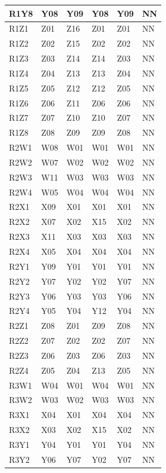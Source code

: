 \documentclass[conference]{IEEEtran}
\begin{document}
{\begin{table}[H]
\begin{tabular}{|l|l|l|l|l|l|}
R1Y8 & Y08 & Y09 & Y08 & Y09 &  NN  \\ \hline
R1Z1 & Z01 & Z16 & Z01 & Z01 &  NN  \\ \hline
R1Z2 & Z02 & Z15 & Z02 & Z02 &  NN  \\ \hline
R1Z3 & Z03 & Z14 & Z14 & Z03 &  NN  \\ \hline
R1Z4 & Z04 & Z13 & Z13 & Z04 &  NN  \\ \hline
R1Z5 & Z05 & Z12 & Z12 & Z05 &  NN  \\ \hline
R1Z6 & Z06 & Z11 & Z06 & Z06 &  NN  \\ \hline
R1Z7 & Z07 & Z10 & Z10 & Z07 &  NN  \\ \hline
R1Z8 & Z08 & Z09 & Z09 & Z08 &  NN  \\ \hline
R2W1 & W08 & W01 & W01 & W01 &  NN  \\ \hline
R2W2 & W07 & W02 & W02 & W02 &  NN  \\ \hline
R2W3 & W11 & W03 & W03 & W03 &  NN  \\ \hline
R2W4 & W05 & W04 & W04 & W04 &  NN  \\ \hline
R2X1 & X09 & X01 & X01 & X01 &  NN  \\ \hline
R2X2 & X07 & X02 & X15 & X02 &  NN  \\ \hline
R2X3 & X11 & X03 & X03 & X03 &  NN  \\ \hline
R2X4 & X05 & X04 & X04 & X04 &  NN  \\ \hline
R2Y1 & Y09 & Y01 & Y01 & Y01 &  NN  \\ \hline
R2Y2 & Y07 & Y02 & Y02 & Y07 &  NN  \\ \hline
R2Y3 & Y06 & Y03 & Y03 & Y06 &  NN  \\ \hline
R2Y4 & Y05 & Y04 & Y12 & Y04 &  NN  \\ \hline
R2Z1 & Z08 & Z01 & Z09 & Z08 &  NN  \\ \hline
R2Z2 & Z07 & Z02 & Z02 & Z07 &  NN  \\ \hline
R2Z3 & Z06 & Z03 & Z06 & Z03 &  NN  \\ \hline
R2Z4 & Z05 & Z04 & Z13 & Z05 &  NN  \\ \hline
R3W1 & W04 & W01 & W04 & W01 &  NN  \\ \hline
R3W2 & W03 & W02 & W03 & W03 &  NN  \\ \hline
R3X1 & X04 & X01 & X04 & X04 &  NN  \\ \hline
R3X2 & X03 & X02 & X15 & X02 &  NN  \\ \hline
R3Y1 & Y04 & Y01 & Y01 & Y04 &  NN  \\ \hline
R3Y2 & Y06 & Y07 & Y02 & Y07 &  NN  \\ \hline

\end{tabular}
\end{table}}
\end{document}
